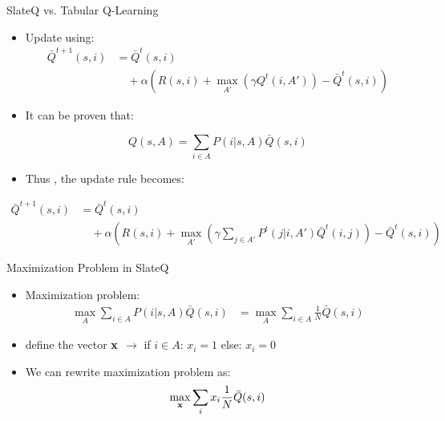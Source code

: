 \documentclass{beamer}
\begin{document}
       
            \begin{frame}{SlateQ vs. Tabular Q-Learning}
                \begin{itemize}
                    \item Update using:
                    \begin{align*}
                        \bar{Q}^{t+1}(s,i) &= \bar{Q}^{t}(s,i) \\
                        &\quad + \alpha\left(R(s,i) + \max_{A'}\left(\gamma Q^{t}(i,A')\right) - \bar{Q}^{t}(s,i)\right)
                    \end{align*}
                    \pause
                    \item It can be proven that:
                    
                        $$    Q(s,A) = \sum_{i\in A}P(i|s,A)\bar{Q}(s,i)$$
                    \pause
                    \item Thus , the update rule becomes:
                \end{itemize}
                \begin{align*}
                    \bar{Q}^{t+1}(s,i) &= \bar{Q}^{t}(s,i) \\
                    &\quad + \alpha\left(R(s,i) + \max_{A'}\left(\gamma \sum_{j\in A'}P^{t}(j|i,A')\bar{Q}^{t}(i,j)\right) - \bar{Q}^{t}(s,i)\right)
                \end{align*}
                \end{frame}
    
    


            \begin{frame}{Maximization Problem in SlateQ}
                \begin{itemize}
                    \item Maximization problem:
                    \begin{align*}
                    \max_{A}\sum_{i\in A}P(i|s,A)\bar{Q}(s,i) &= \max_{A}\sum_{i\in A}\frac{1}{N}\bar{Q}(s,i) 
                    \end{align*}
                    \pause
                    \item define the vector $\bf x$ $\rightarrow$ if $i\in A$: $x_i= 1$ else: $x_i = 0$
                    \pause
                    \item We can rewrite maximization problem as:
                    $$\max_{\bf x}\sum_{i}x_i\frac{1}{N}\bar{Q}(s,i) $$
                \end{itemize}
                \end{frame}
            
\end{document}
